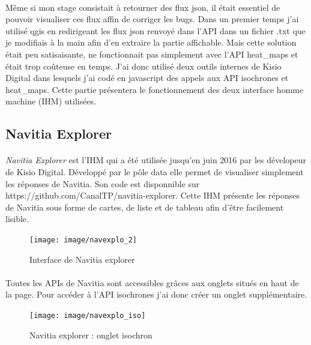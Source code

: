 \documentclass[a4paper]{report}
\begin{document}
\paragraph{} Même si mon stage consistait à retourner des flux json, il était essentiel de pouvoir visualiser ces flux affin de corriger les bugs. Dans un premier temps j'ai utilisé qgis en redirigeant les flux json renvoyé dans l'API dans un fichier .txt que je modifiais à la main afin d'en extraire la partie affichable. Mais cette solution était peu satisaisante, ne fonctionnait pas simplement avec l'API heat\_maps et était trop coûteuse en temps. J'ai donc utilisé deux outils internes de Kisio Digital dans lesquels j'ai codé en javascript des appels aux API isochrones et heat\_maps. Cette partie présentera le fonctionnement des deux interface homme machine (IHM) utilisées.

\subsection{Navitia Explorer}

\paragraph{} \emph{Navitia Explorer} est l'IHM qui a été utilisée jusqu'en juin 2016 par les dévelopeur de Kisio Digital. Développé par le pôle data elle permet de visualiser simplement les réponses de Navitia. Son code est disponnible sur \color{blue} https://github.com/CanalTP/navitia-explorer\color{black}. Cette IHM présente les réponses de Navitia sous forme de cartes, de liste et de tableau afin d'être facilement lisible.

\begin{figure}[H]
	\begin{center}
		\texttt{[image: image/navexplo\_2]}
		\caption{Interface de Navitia explorer}
		\label{Interface de Navitia explorer}
	\end{center}
\end{figure}

\paragraph{} Toutes les APIs de Navitia sont accessibles grâces aux onglets situés en haut de la page. Pour accéder à l'API isochrones j'ai donc créer un onglet supplémentaire.

\begin{figure}[H]
	\begin{center}
		\texttt{[image: image/navexplo\_iso]}
		\caption{Navitia explorer : onglet isochron}
		\label{Navitia explorer : onglet isochron}
	\end{center}
\end{figure}
\end{document}
